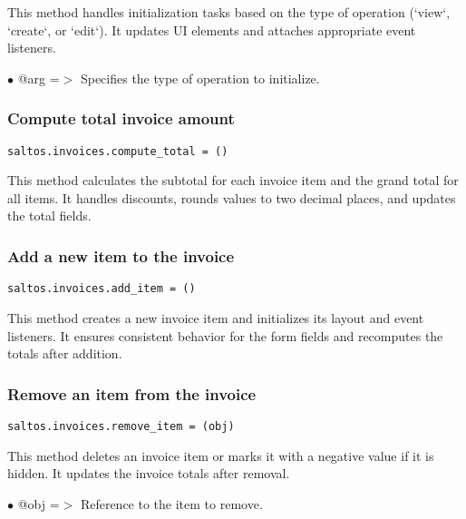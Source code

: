 \documentclass[a4paper]{article}
\begin{document}
This method handles initialization tasks based on the type of operation (`view`, `create`, or `edit`).
It updates UI elements and attaches appropriate event listeners.

\begin{compactitem}
\item[\color{myblue}$\bullet$] @arg =$>$ Specifies the type of operation to initialize.
\end{compactitem}

\hypertarget{toc143}{}
\subsubsection{Compute total invoice amount}

\begin{lstlisting}
saltos.invoices.compute_total = ()
\end{lstlisting}

This method calculates the subtotal for each invoice item and the grand total for all items.
It handles discounts, rounds values to two decimal places, and updates the total fields.

\hypertarget{toc144}{}
\subsubsection{Add a new item to the invoice}

\begin{lstlisting}
saltos.invoices.add_item = ()
\end{lstlisting}

This method creates a new invoice item and initializes its layout and event listeners.
It ensures consistent behavior for the form fields and recomputes the totals after addition.

\hypertarget{toc145}{}
\subsubsection{Remove an item from the invoice}

\begin{lstlisting}
saltos.invoices.remove_item = (obj)
\end{lstlisting}

This method deletes an invoice item or marks it with a negative value if it is hidden.
It updates the invoice totals after removal.

\begin{compactitem}
\item[\color{myblue}$\bullet$] @obj =$>$ Reference to the item to remove.
\end{compactitem}
\end{document}
